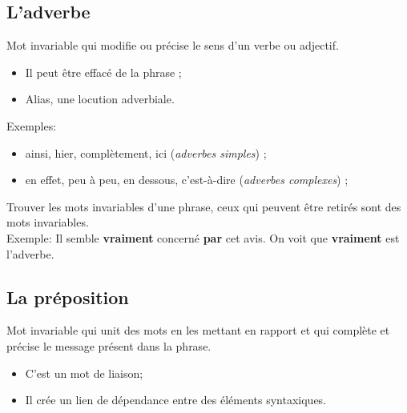 \documentclass[10pt, french]{article}
\begin{document}
\begin{multicols*}{2}
\begin{definitionNOHFILLsub}

\end{definitionNOHFILLsub}

\begin{definitionNOHFILLsub}

\end{definitionNOHFILLsub}


\columnbreak
\subsection{L'adverbe}\label{sec:classes-adv}
\begin{definitionNOHFILLsub}[Adverbe]
Mot invariable qui modifie ou précise le sens d'un verbe ou adjectif.
\begin{itemize}
	\item	Il peut être effacé de la phrase ;
	\item	Alias, une locution adverbiale.
\end{itemize}

\tcbline

Exemples:
\begin{itemize}
	\item	ainsi, hier, complètement, ici (\textit{adverbes simples}) ;
	\item	en effet, peu à peu, en dessous, c'est-à-dire (\textit{adverbes complexes}) ;
\end{itemize}
\begin{astuces}
Trouver les mots invariables d'une phrase, ceux qui peuvent être retirés sont des mots invariables.\\
Exemple:	Il semble \textbf{\color{teal}vraiment} concerné \textbf{par} cet avis. On voit que \textbf{\color{teal}vraiment} est l'adverbe.
\end{astuces}
\end{definitionNOHFILLsub}


\subsection{La préposition}\label{sec:classes-prepo}
\begin{definitionNOHFILL}[La préposition]
Mot invariable qui unit des mots en les mettant en rapport et qui complète et précise le message présent dans la phrase.
\begin{itemize}
	\item	C'est un mot de liaison;
	\item	Il crée un lien de dépendance entre des éléments syntaxiques.
\end{itemize}


\end{definitionNOHFILL}
\end{multicols*}
\end{document}
